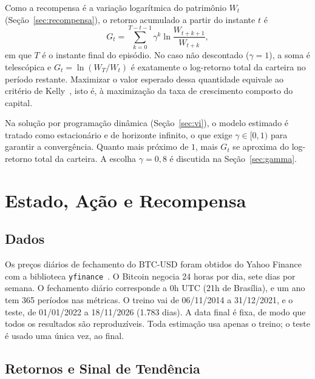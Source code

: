 \documentclass[conference]{IEEEtran}
\begin{document}
Como a recompensa é a variação logarítmica do patrimônio $W_t$ (Seção~\ref{sec:recompensa}), o retorno acumulado a partir do instante $t$ é
\begin{equation}
  G_t = \sum_{k=0}^{T-t-1} \gamma^k \ln\frac{W_{t+k+1}}{W_{t+k}},
  \label{eq:retorno}
\end{equation}
em que $T$ é o instante final do episódio. No caso não descontado ($\gamma = 1$), a soma é telescópica e $G_t = \ln(W_T / W_t)$ é exatamente o log-retorno total da carteira no período restante. Maximizar o valor esperado dessa quantidade equivale ao critério de Kelly~\cite{kelly1956}, isto é, à maximização da taxa de crescimento composto do capital.

Na solução por programação dinâmica (Seção~\ref{sec:vi}), o modelo estimado é tratado como estacionário e de horizonte infinito, o que exige $\gamma \in [0, 1)$ para garantir a convergência. Quanto mais próximo de $1$, mais $G_t$ se aproxima do log-retorno total da carteira. A escolha $\gamma = 0{,}8$ é discutida na Seção~\ref{sec:gamma}.

\section{Estado, Ação e Recompensa}
\label{sec:mdp}

\subsection{Dados}

Os preços diários de fechamento do BTC-USD foram obtidos do Yahoo Finance com a biblioteca \texttt{yfinance}~\cite{yfinance}. O Bitcoin negocia 24 horas por dia, sete dias por semana. O fechamento diário corresponde a 0h UTC (21h de Brasília), e um ano tem 365 períodos nas métricas. O treino vai de 06/11/2014 a 31/12/2021, e o teste, de 01/01/2022 a 18/11/2026 (1.783 dias). A data final é fixa, de modo que todos os resultados são reproduzíveis. Toda estimação usa apenas o treino; o teste é usado uma única vez, ao final.

\subsection{Retornos e Sinal de Tendência}
\end{document}
